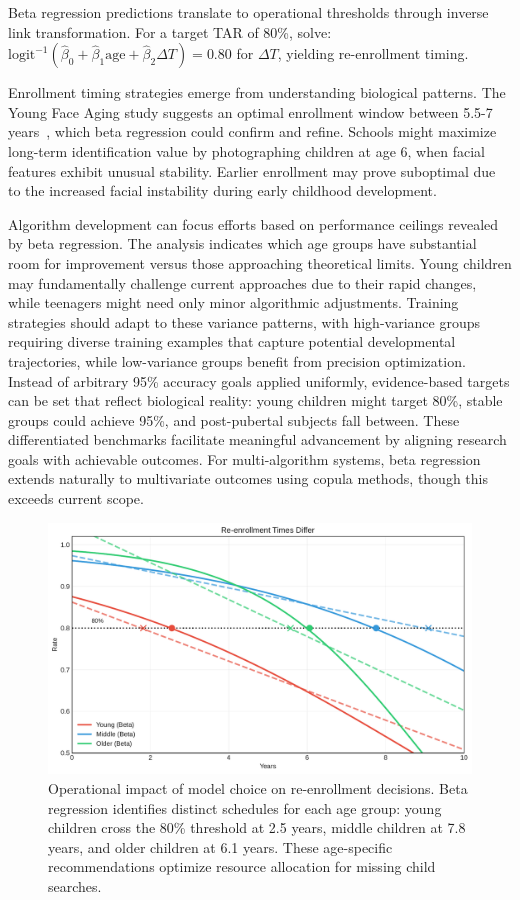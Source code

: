\documentclass[10pt,journal,compsoc]{IEEEtran}
\begin{document}
Beta regression predictions translate to operational thresholds through inverse link transformation. For a target TAR of 80\%, solve: $\text{logit}^{-1}(\hat{\beta}_0 + \hat{\beta}_1 \text{age} + \hat{\beta}_2 \Delta T) = 0.80$ for $\Delta T$, yielding re-enrollment timing.

Enrollment timing strategies emerge from understanding biological patterns. The Young Face Aging study suggests an optimal enrollment window between 5.5-7 years~\cite{bahmani2023}, which beta regression could confirm and refine. Schools might maximize long-term identification value by photographing children at age 6, when facial features exhibit unusual stability. Earlier enrollment may prove suboptimal due to the increased facial instability during early childhood development.

Algorithm development can focus efforts based on performance ceilings revealed by beta regression. The analysis indicates which age groups have substantial room for improvement versus those approaching theoretical limits. Young children may fundamentally challenge current approaches due to their rapid changes, while teenagers might need only minor algorithmic adjustments. Training strategies should adapt to these variance patterns, with high-variance groups requiring diverse training examples that capture potential developmental trajectories, while low-variance groups benefit from precision optimization. Instead of arbitrary 95\% accuracy goals applied uniformly, evidence-based targets can be set that reflect biological reality: young children might target 80\%, stable groups could achieve 95\%, and post-pubertal subjects fall between. These differentiated benchmarks facilitate meaningful advancement by aligning research goals with achievable outcomes. For multi-algorithm systems, beta regression extends naturally to multivariate outcomes using copula methods, though this exceeds current scope.

\begin{figure}[htbp]
\centering
\includegraphics[width=\columnwidth]{operational_impact.pdf}
\caption{Operational impact of model choice on re-enrollment decisions. Beta regression identifies distinct schedules for each age group: young children cross the 80\% threshold at 2.5 years, middle children at 7.8 years, and older children at 6.1 years. These age-specific recommendations optimize resource allocation for missing child searches.}
\label{fig:operational-impact}
\end{figure}
\end{document}
